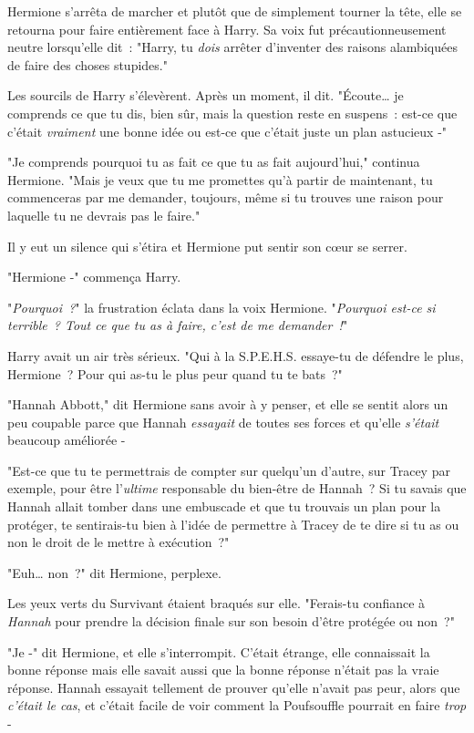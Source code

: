 Hermione s'arrêta de marcher et plutôt que de simplement tourner la tête, elle se retourna pour faire entièrement face à Harry. Sa voix fut précautionneusement neutre lorsqu'elle dit~: "Harry, tu \emph{dois} arrêter d'inventer des raisons alambiquées de faire des choses stupides."

Les sourcils de Harry s'élevèrent. Après un moment, il dit. "Écoute… je comprends ce que tu dis, bien sûr, mais la question reste en suspens~: est-ce que c'était \emph{vraiment} une bonne idée ou est-ce que c'était juste un plan astucieux -"

"Je comprends pourquoi tu as fait ce que tu as fait aujourd'hui," continua Hermione. "Mais je veux que tu me promettes qu'à partir de maintenant, tu commenceras par me demander, toujours, même si tu trouves une raison pour laquelle tu ne devrais pas le faire."

Il y eut un silence qui s'étira et Hermione put sentir son cœur se serrer.

"Hermione -" commença Harry.

"\emph{Pourquoi~?}" la frustration éclata dans la voix Hermione. "\emph{Pourquoi est-ce si terrible~? Tout ce que tu as à faire, c'est de me demander~!}"

Harry avait un air très sérieux. "Qui à la S.P.E.H.S. essaye-tu de défendre le plus, Hermione~? Pour qui as-tu le plus peur quand tu te bats~?"

"Hannah Abbott," dit Hermione sans avoir à y penser, et elle se sentit alors un peu coupable parce que Hannah \emph{essayait} de toutes ses forces et qu'elle \emph{s'était} beaucoup améliorée -

"Est-ce que tu te permettrais de compter sur quelqu'un d'autre, sur Tracey par exemple, pour être l'\emph{ultime} responsable du bien-être de Hannah~? Si tu savais que Hannah allait tomber dans une embuscade et que tu trouvais un plan pour la protéger, te sentirais-tu bien à l'idée de permettre à Tracey de te dire si tu as ou non le droit de le mettre à exécution~?"

"Euh… non~?" dit Hermione, perplexe.

Les yeux verts du Survivant étaient braqués sur elle. "Ferais-tu confiance à \emph{Hannah} pour prendre la décision finale sur son besoin d'être protégée ou non~?"

"Je -" dit Hermione, et elle s'interrompit. C'était étrange, elle connaissait la bonne réponse mais elle savait aussi que la bonne réponse n'était pas la vraie réponse. Hannah essayait tellement de prouver qu'elle n'avait pas peur, alors que \emph{c'était le cas}, et c'était facile de voir comment la Poufsouffle pourrait en faire \emph{trop} -

